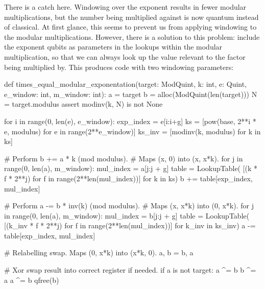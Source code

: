 \documentclass[onecolumn,unpublished]{quantumarticle}
\theoremstyle{definition}
\theoremstyle{definition}
\theoremstyle{definition}
\begin{document}
There is a catch here.
Windowing over the exponent results in fewer modular multiplications, but the number being multiplied against is now quantum instead of classical.
At first glance, this seems to prevent us from applying windowing to the modular multiplications.
However, there is a solution to this problem: include the exponent qubits as parameters in the lookups within the modular multiplication, so that we can always look up the value relevant to the factor being multiplied by.
This produces code with two windowing parameters:

\begin{python}
    def times_equal_modular_exponentation(target: ModQuint,
                                          k: int,
                                          e: Quint,
                                          e_window: int,
                                          m_window: int):
        a = target
        b = alloc(ModQuint(len(target)))
        N = target.modulus
        assert modinv(k, N) is not None

        for i in range(0, len(e), e_window):
            exp_index = e[i:i+g]
            ks = [pow(base, 2**i * e, modulus)
                  for e in range(2**e_window)]
            ks_inv = [modinv(k, modulus) for k in ks]
    
            # Perform b += a * k (mod modulus).
            # Maps (x, 0) into (x, x*k).
            for j in range(0, len(a), m_window):
                mul_index = a[j:j + g]
                table = LookupTable(
                    [(k * f * 2**j) %
                     for f in range(2**len(mul_index))]
                    for k in ks)
                b += table[exp_index, mul_index]
    
            # Perform a -= b * inv(k) (mod modulus).
            # Maps (x, x*k) into (0, x*k).
            for j in range(0, len(a), m_window):
                mul_index = b[j:j + g]
                table = LookupTable(
                    [(k_inv * f * 2**j) %
                     for f in range(2**len(mul_index))]
                    for k_inv in ks_inv)
                a -= table[exp_index, mul_index]
    
            # Relabelling swap. Maps (0, x*k) into (x*k, 0).
            a, b = b, a

        # Xor swap result into correct register if needed.
        if a is not target:
            a ^= b
            b ^= a
            a ^= b
        qfree(b)
\end{python}
\end{document}

